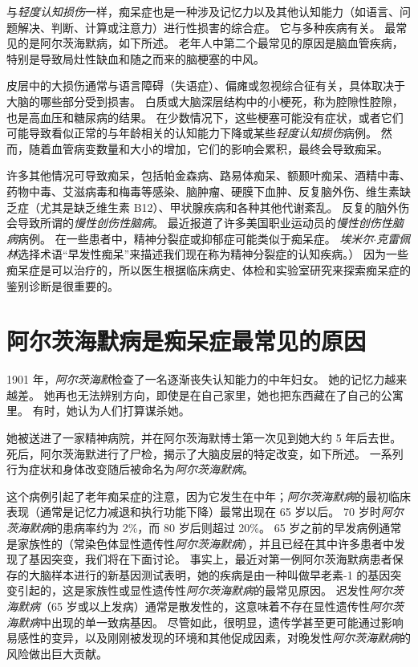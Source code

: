 与\textit{轻度认知损伤}一样，痴呆症也是一种涉及记忆力以及其他认知能力（如语言、问题解决、判断、计算或注意力）进行性损害的综合症。
它与多种疾病有关。
最常见的是阿尔茨海默病，如下所述。
老年人中第二个最常见的原因是脑血管疾病，特别是导致局灶性缺血和随之而来的脑梗塞的中风。


皮层中的大损伤通常与语言障碍（失语症）、偏瘫或忽视综合征有关，具体取决于大脑的哪些部分受到损害。
白质或大脑深层结构中的小梗死，称为腔隙性腔隙，也是高血压和糖尿病的结果。
在少数情况下，这些梗塞可能没有症状，或者它们可能导致看似正常的与年龄相关的认知能力下降或某些\textit{轻度认知损伤}病例。
然而，随着血管病变数量和大小的增加，它们的影响会累积，最终会导致痴呆。


许多其他情况可导致痴呆，包括帕金森病、路易体痴呆、额颞叶痴呆、酒精中毒、药物中毒、艾滋病毒和梅毒等感染、脑肿瘤、硬膜下血肿、反复脑外伤、维生素缺乏症（尤其是缺乏维生素 B12）、甲状腺疾病和各种其他代谢紊乱。
反复的脑外伤会导致所谓的\textit{慢性创伤性脑病}。
最近报道了许多美国职业运动员的\textit{慢性创伤性脑病}病例。
在一些患者中，精神分裂症或抑郁症可能类似于痴呆症。
\textit{埃米尔$\cdot$克雷佩林}选择术语“早发性痴呆”来描述我们现在称为精神分裂症的认知疾病。）
因为一些痴呆症是可以治疗的，所以医生根据临床病史、体检和实验室研究来探索痴呆症的鉴别诊断是很重要的。



\section{阿尔茨海默病是痴呆症最常见的原因}

1901 年，\textit{阿尔茨海默}检查了一名逐渐丧失认知能力的中年妇女。
她的记忆力越来越差。
她再也无法辨别方向，即使是在自己家里，她也把东西藏在了自己的公寓里。
有时，她认为人们打算谋杀她。


她被送进了一家精神病院，并在阿尔茨海默博士第一次见到她大约 5 年后去世。
死后，阿尔茨海默进行了尸检，揭示了大脑皮层的特定改变，如下所述。
一系列行为症状和身体改变随后被命名为\textit{阿尔茨海默病}。


这个病例引起了老年痴呆症的注意，因为它发生在中年；\textit{阿尔茨海默病}的最初临床表现（通常是记忆力减退和执行功能下降）最常出现在 65 岁以后。
70 岁时\textit{阿尔茨海默病}的患病率约为 2\%，而 80 岁后则超过 20\%。
65 岁之前的早发病例通常是家族性的（常染色体显性遗传性\textit{阿尔茨海默病}），并且已经在其中许多患者中发现了基因突变，我们将在下面讨论。
事实上，最近对第一例阿尔茨海默病患者保存的大脑样本进行的新基因测试表明，她的疾病是由一种叫做早老素-1 的基因突变引起的，这是家族性或显性遗传性\textit{阿尔茨海默病}的最常见原因。
迟发性\textit{阿尔茨海默病}（65 岁或以上发病）通常是散发性的，这意味着不存在显性遗传性\textit{阿尔茨海默病}中出现的单一致病基因。
尽管如此，很明显，遗传学甚至更可能通过影响易感性的变异，以及刚刚被发现的环境和其他促成因素，对晚发性\textit{阿尔茨海默病}的风险做出巨大贡献。


